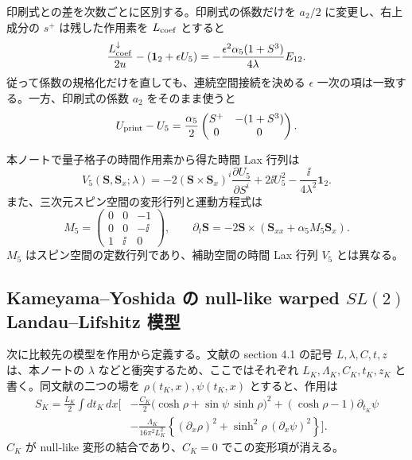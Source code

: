 印刷式との差を次数ごとに区別する。印刷式の係数だけを $a_2/2$ に変更し、右上成分の $s^+$ は残した作用素を $L_{\rm coef}$ とすると
\begin{equation}
\frac{L_{\rm coef}^{\downarrow}}{2u}
-\left(\mathbf1_2+\epsilon U_5\right)
=-\frac{\epsilon^2\alpha_5(1+S^3)}{4\lambda}E_{12}.
\label{eq:c5corr-subleading-difference}
\end{equation}
従って係数の規格化だけを直しても、連続空間接続を決める $\epsilon$ 一次の項は一致する。一方、印刷式の係数 $a_2$ をそのまま使うと
\begin{equation}
U_{\rm print}-U_5
=\frac{\alpha_5}{2}
\begin{pmatrix}S^+&-(1+S^3)\\0&0\end{pmatrix}.
\label{eq:c5corr-leading-difference}
\end{equation}

本ノートで量子格子の時間作用素から得た時間 Lax 行列は
\begin{equation}
V_5(\boldsymbol S,\boldsymbol S_x;\lambda)
=-2(\boldsymbol S\times\boldsymbol S_x)^i
\frac{\partial U_5}{\partial S^i}
+2\ii U_5^2-\frac{\ii}{4\lambda^2}\mathbf1_2.
\label{eq:c5corr-V}
\end{equation}
また、三次元スピン空間の変形行列と運動方程式は
\begin{equation}
M_5=\begin{pmatrix}0&0&-1\\0&0&-\ii\\1&\ii&0\end{pmatrix},
\qquad
\partial_t\boldsymbol S=-2\boldsymbol S\times
(\boldsymbol S_{xx}+\alpha_5M_5\boldsymbol S_x).
\label{eq:c5corr-eom}
\end{equation}
$M_5$ はスピン空間の定数行列であり、補助空間の時間 Lax 行列 $V_5$ とは異なる。

\subsection{Kameyama--Yoshida の null-like warped $SL(2)$ Landau--Lifshitz 模型}

次に比較先の模型を作用から定義する。文献\cite{KY2014}の section 4.1 の記号 $L,\lambda,C,t,z$ は、本ノートの $\lambda$ などと衝突するため、ここではそれぞれ $L_K,\Lambda_K,C_K,t_K,z_K$ と書く。同文献の二つの場を $\rho(t_K,x),\psi(t_K,x)$ とすると、作用は
\begin{align}
S_K=\frac{L_K}{2}\int dt_K\,dx\Bigg[&
-\frac{C_K}{2}\bigl(\cosh\rho+\sin\psi\,\sinh\rho\bigr)^2
+(\cosh\rho-1)\partial_{t_K}\psi
\nonumber\\
&-\frac{\Lambda_K}{16\pi^2L_K^2}
\left\{(\partial_x\rho)^2+\sinh^2\rho\,(\partial_x\psi)^2\right\}
\Bigg].
\label{eq:c5corr-K-action}
\end{align}
$C_K$ が null-like 変形の結合であり、$C_K=0$ でこの変形項が消える。

